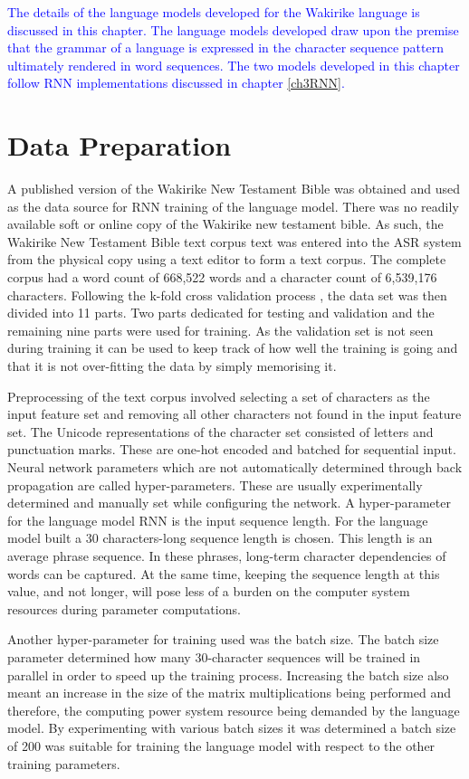 
\textcolor{blue}{
The details of the language models developed for the Wakirike language is discussed in this chapter.  The language models developed draw  upon the premise that the grammar of a language is expressed in the character sequence pattern ultimately rendered in word sequences.  The two models developed in this chapter follow RNN implementations discussed in chapter \ref{ch3RNN}. }

\section{Data Preparation}
\startblue
A published version of the Wakirike New Testament Bible was obtained and used as the data source for RNN training of the language model.  There was no readily available soft or online copy of the Wakirike new testament bible. As such, the Wakirike New Testament Bible text corpus text was entered into the ASR system from the physical copy using a text editor to form a text corpus.  The complete corpus had a word count of 668,522 words and a character count of 6,539,176 characters. Following the k-fold cross validation process \citep{geron2019hands}, the data set was then divided into 11 parts. Two parts dedicated for testing and validation and the remaining nine parts were used for training. As the validation set is not seen during training it can be used to keep track of how well the training is going and that it is not over-fitting the data by simply memorising it.

Preprocessing of the text corpus involved selecting a set of characters as the input feature set and removing all other characters not found in the input feature set.  The Unicode representations of the character set consisted of letters and punctuation marks.  These are one-hot encoded and batched for sequential input.  Neural network parameters which are not automatically determined through back propagation are called hyper-parameters.  These are usually experimentally determined and manually set while configuring the network.  A hyper-parameter for the language model RNN is the input sequence length.  For the language model built a 30 characters-long sequence length is chosen.  This  length is an average phrase sequence.  In these phrases, long-term character dependencies of words can be captured. At the same time, keeping the sequence length at this value, and not longer, will pose less of a burden on the computer system resources during parameter computations.  

Another hyper-parameter for training used was the batch size.  The batch size parameter determined how many 30-character sequences will be trained in parallel in order to speed up the training process.  Increasing the batch size also meant an increase in the size of the matrix multiplications being performed and therefore, the computing power system resource being demanded by the language model.  By experimenting with various batch sizes it was determined a batch size of 200 was suitable for training the language model with respect to the other training parameters.

